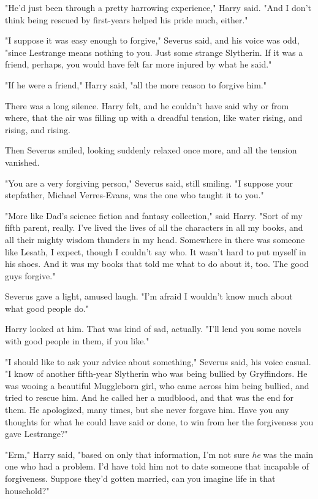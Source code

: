 "He'd just been through a pretty harrowing experience," Harry said. "And I 
don't think being rescued by first-years helped his pride much, either."

"I suppose it was easy enough to forgive," Severus said, and his voice was odd, 
"since Lestrange means nothing to you. Just some strange Slytherin. If it was a 
friend, perhaps, you would have felt far more injured by what he said."

"If he were a friend," Harry said, "all the more reason to forgive him."

There was a long silence. Harry felt, and he couldn't have said why or from 
where, that the air was filling up with a dreadful tension, like water rising, 
and rising, and rising.

Then Severus smiled, looking suddenly relaxed once more, and all the tension 
vanished.

"You are a very forgiving person," Severus said, still smiling. "I suppose your 
stepfather, Michael Verres-Evans, was the one who taught it to you."

"More like Dad's science fiction and fantasy collection," said Harry. "Sort of 
my fifth parent, really. I've lived the lives of all the characters in all my 
books, and all their mighty wisdom thunders in my head. Somewhere in there was 
someone like Lesath, I expect, though I couldn't say who. It wasn't hard to put 
myself in his shoes. And it was my books that told me what to do about it, too. 
The good guys forgive."

Severus gave a light, amused laugh. "I'm afraid I wouldn't know much about what 
good people do."

Harry looked at him. That was kind of sad, actually. "I'll lend you some novels 
with good people in them, if you like."

"I should like to ask your advice about something," Severus said, his voice 
casual. "I know of another fifth-year Slytherin who was being bullied by 
Gryffindors. He was wooing a beautiful Muggleborn girl, who came across him 
being bullied, and tried to rescue him. And he called her a mudblood, and that 
was the end for them. He apologized, many times, but she never forgave him. 
Have you any thoughts for what he could have said or done, to win from her the 
forgiveness you gave Lestrange?"

"Erm," Harry said, "based on only that information, I'm not sure \emph{he} was 
the main one who had a problem. I'd have told him not to date someone that 
incapable of forgiveness. Suppose they'd gotten married, can you imagine life 
in that household?"

